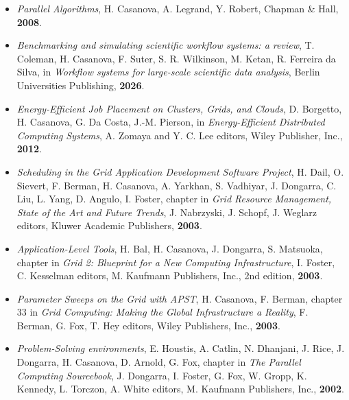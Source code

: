 
\begin{itemize}
\item [1.] {\it Parallel Algorithms}, H. Casanova, A. Legrand, Y. Robert, Chapman \& Hall, {\bf 2008}.

\end{itemize}


\begin{itemize}

\item [7.] 
{\it Benchmarking and simulating scientific workflow systems: a review},
T. Coleman, H. Casanova, F. Suter, S. R. Wilkinson, M. Ketan, R. Ferreira da Silva,
in {\it Workflow systems for large-scale scientific data analysis},
Berlin Universities Publishing, {\bf 2026}.

\item [6.] 
{\it Energy-Efficient Job Placement on Clusters, Grids, and Clouds},
D. Borgetto, H. Casanova, G. Da Costa, J.-M. Pierson,
in {\it Energy-Efficient Distributed Computing Systems},
A. Zomaya and Y. C. Lee editors, Wiley Publisher, Inc., {\bf 2012}.

\item [6.] 
{\it Scheduling in the Grid Application Development Software Project},
H. Dail, O. Sievert, F. Berman, H. Casanova, A. Yarkhan, S. Vadhiyar,
J. Dongarra, C. Liu, L. Yang, D. Angulo, I. Foster, chapter in {\it Grid
Resource Management, State of the Art and Future Trends}, J. Nabrzyski,
J. Schopf, J. Weglarz editors, Kluwer Academic Publishers, {\bf 2003}.


\item [5.] 
{\it Application-Level Tools}, H. Bal, H. Casanova, J. Dongarra,
S. Matsuoka, chapter in {\it Grid 2: Blueprint for a New
Computing Infrastructure}, I. Foster, C. Kesselman editors, M. Kaufmann
Publishers, Inc., 2nd edition, {\bf 2003}.

\item[4.]
{\it Parameter Sweeps on the Grid with APST}, H. Casanova, F. Berman,
chapter 33 in {\it Grid Computing: Making the Global Infrastructure a
Reality}, F. Berman, G. Fox, T. Hey editors, Wiley Publishers, Inc.,
{\bf 2003}.

\item[3.]
{\it Problem-Solving environments}, E. Houstis, A. Catlin, N. Dhanjani,
J. Rice, J. Dongarra, H. Casanova, D. Arnold, G. Fox, chapter in {\it The
Parallel Computing Sourcebook}, J. Dongarra, I. Foster, G. Fox, W. Gropp,
K. Kennedy, L. Torczon, A. White editors, M. Kaufmann Publishers, Inc.,
{\bf 2002}.


\end{itemize}
